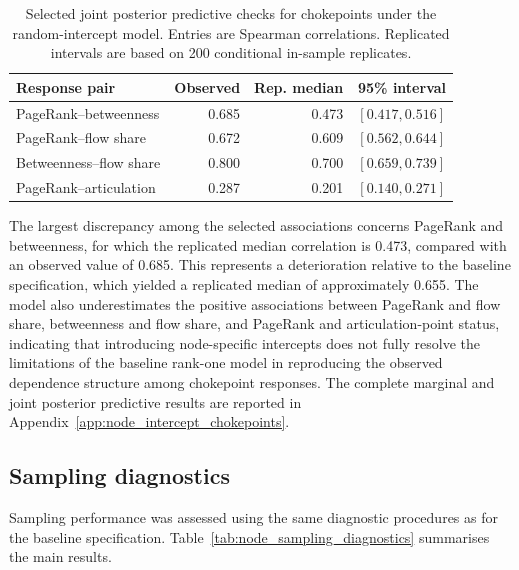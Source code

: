 \documentclass[pdftex,12pt,openright,a4paper,oneside]{book}
\begin{document}
\begin{table}[htbp]
\centering
\small
\caption{Selected joint posterior
predictive checks for chokepoints
under the random-intercept model.
Entries are Spearman correlations.
Replicated intervals are based on
200 conditional in-sample replicates.}
\label{tab:node_chokepoint_joint_ppc}
\begin{tabular}{lrrr}
\hline
Response pair & Observed
& Rep. median & 95\% interval \\
\hline
PageRank--betweenness
& 0.685 & 0.473 & $[0.417,0.516]$ \\
PageRank--flow share
& 0.672 & 0.609 & $[0.562,0.644]$ \\
Betweenness--flow share
& 0.800 & 0.700 & $[0.659,0.739]$ \\
PageRank--articulation
& 0.287 & 0.201 & $[0.140,0.271]$ \\
\hline
\end{tabular}
\end{table}

The largest discrepancy among the selected associations concerns PageRank and betweenness, 
for which the replicated median correlation is 0.473, compared with an observed value of 0.685. 
This represents a deterioration relative to the baseline specification, which yielded a replicated median of approximately 0.655.
The model also underestimates the positive associations between PageRank and flow share, 
betweenness and flow share, and PageRank and articulation-point status, indicating that introducing node-specific intercepts does not fully resolve the limitations 
of the baseline rank-one model in reproducing the observed dependence structure among chokepoint responses.
The complete marginal and joint posterior predictive results are reported in Appendix~\ref{app:node_intercept_chokepoints}.

\subsection{Sampling diagnostics}
\label{subsec:node_sampling_diagnostics}

Sampling performance was assessed using the same diagnostic procedures as for the baseline specification.
Table~\ref{tab:node_sampling_diagnostics} summarises the main results.
\end{document}
